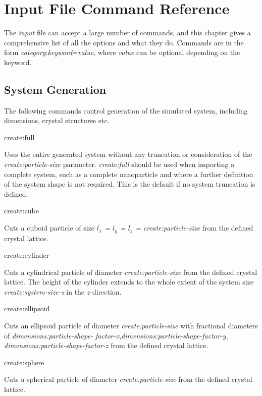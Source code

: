 \chapter{Input File Command Reference}\label{chap:InputFileCommandReference}
The \textit{input} file can accept a large number of commands, and this chapter gives a comprehensive list of all the options and what they do. Commands are in the form \textit{category}:\textit{keyword}=\textit{value}, where \textit{value} can be optional depending on the keyword.

\section*{System Generation}
The following commands control generation of the simulated system, including dimensions, crystal structures etc.

{\zicf create:full} Uses the entire generated system without any truncation or consideration of the \textit{create:particle-size} parameter. \textit{create:full} should be used when importing a complete system, such as a complete nanoparticle and where a further definition of the system shape is not required. This is the default if no system truncation is defined.

{\zicf create:cube} Cuts a cuboid particle of size \textit{$l_x$ = $l_y$ = $l_z$ = create:particle-size} from the defined crystal lattice.

{\zicf create:cylinder} Cuts a cylindrical particle of diameter \textit{create:particle-size} from the defined crystal lattice. The height of the cylinder extends to the whole extent of the system size \textit{create:system-size-z} in the $z$-direction.

{\zicf create:ellipsoid} Cuts an ellipsoid particle of diameter \textit{create:particle-size} with fractional diameters of \textit{dimensions:particle-shape- factor-x},\textit{dimensions:particle-shape-factor-y}, \textit{dimensions:particle-shape-factor-z} from the defined crystal lattice.

{\zicf create:sphere} Cuts a spherical particle of diameter \textit{create:particle-size} from the defined crystal lattice.

